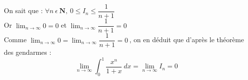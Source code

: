 \documentclass[oneside, 12pt, openany]{book}
\begin{document}
	On sait que : $\forall n\ \epsilon\ \mathbf{N},\ 0\leqslant I_n\leqslant \dfrac{1}{n+1}$\\
	Or $\displaystyle{\lim_{n\to\infty}0=0}$ et $\displaystyle{\lim_{n\to\infty}\dfrac{1}{n+1}=0}$\\
	Comme $\displaystyle{\lim_{n\to\infty}0}=\displaystyle{\lim_{n\to\infty}\dfrac{1}{n+1}=0}\ $, on en déduit que d'après le théorème des gendarmes : $$\displaystyle{\lim_{n\to\infty} \int_{0}^{1} \dfrac{x^n}{1+x}\ dx=\lim_{n\to\infty}I_n=0}$$
\end{document}
